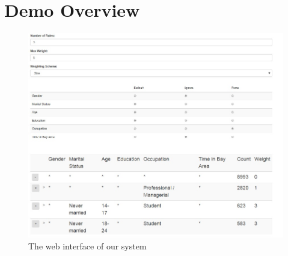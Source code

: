 
\section{Demo Overview} \label{sec:demo} 
\begin{figure}
\vspace{-5pt}
\centering
\includegraphics[width=160mm,frame]{graphs/tsapp_screenshot.jpg}
\vspace{-10pt}
\caption{The web interface of our system \label{fig:interface}}
\vspace{-20pt}
\end{figure}